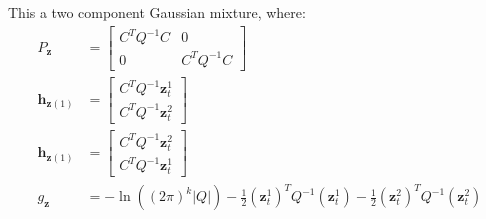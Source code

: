 This a two component Gaussian mixture, where:
\begin{align}
P_{\pmb{z}} &= \begin{bmatrix}
C^{T} Q^{-1} C & 0 \\
0 & C^{T} Q^{-1} C 
\end{bmatrix} \\
\pmb{h}_{\pmb{z}(1)} &=  \begin{bmatrix}
C^{T} Q^{-1} \pmb{z}_{t}^{1} \\
C^{T} Q^{-1} \pmb{z}_{t}^{2} 
\end{bmatrix} \\
\pmb{h}_{\pmb{z}(1)} &=  \begin{bmatrix}
C^{T} Q^{-1} \pmb{z}_{t}^{2} \\
C^{T} Q^{-1} \pmb{z}_{t}^{1} 
\end{bmatrix} \\
g_{\pmb{z}} &= - \ln \left( \left( 2 \pi \right)^{k} | Q | \right) - \frac{1}{2} (\pmb{z}_{t}^{1})^{T} Q^{-1} (\pmb{z}_{t}^{1}) - \frac{1}{2} (\pmb{z}_{t}^{2})^{T} Q^{-1} (\pmb{z}_{t}^{2})
\end{align}

